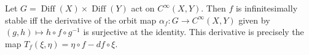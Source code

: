 Let $G = \operatorname{Diff}(X) \times \operatorname{Diff}(Y)$ act on $C^\infty(X, Y)$. Then $f$ is infinitesimally stable iff the derivative of the orbit map $\alpha_f: G \to C^\infty(X, Y)$ given by $(g, h) \mapsto h \circ f \circ g^{-1}$ is surjective at the identity. This derivative is precisely the map $T_f(\xi, \eta) = \eta \circ f - df \circ \xi$.

